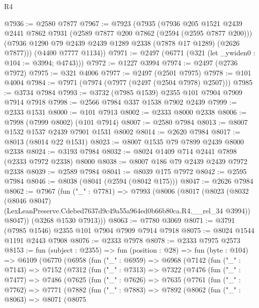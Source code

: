 \begin{lexlean}{R4}
\begin{coremodule}
@7936 := @2580 @7877
@7967 := @7923
    (@7935
      (@7936
        @205
        @1521
        @2439
        @2441
        @7862
        @7931
        (@2589 @7877 @200 @7862 (@2594 (@2595 @7877 @200)))
        (@7936 @1290 @79 @2439 @2439 @1289 @2338 (@7878 @17 @1289) (@2626 @7877)))
      (@4400 @7777 @1134))
@7971 := @2497 (@6771 (@321 (let _ywiden0 : @104 := @3994; @4743)))
@7972 := @1227 @3994
@7974 := @2497 (@2736 @7972)
@7975 := @321 @4006
@7977 := @2497 (@2501 @7975)
@7978 := @101 @4004
@7984 := @7971 (@7974 (@7977 (@2497 (@2504 @7978) @2507)))
@7985 := @3734 @7984
@7993 := @3732 (@7985 @1539) @2355 @101 @7904 @7909 @7914 @7918
@7998 := @2566 @7984 @337 @1538 @7902 @2439
@7999 := @2333 @1531
@8000 := @101 @7913
@8002 := @2333 @8000 @2338
@8006 := @7998 (@7999 @8002) (@101 @7914)
@8007 := @2580 @7984
@8013 := @8007 @1532 @1537 @2439 @7901 @1531 @8002
@8014 := @2620 @7984
@8017 := @8013 (@8014 @22 @1531)
@8023 := @8007 @1535 @79 @7899 @2439 @8000 @2338
@8024 := @3193 @7984
@8032 := @8024 @1409 @714 @2441 @7898 (@2333 @7972 @2338) @8000
@8038 := @8007 @186 @79 @2439 @2439 @7972 @2338
@8039 := @2589 @7984
@8041 := @8039 @175 @7972
@8042 := @2595 @7984
@8046 := @8038 (@8041 (@2594 (@8042 @175)))
@8047 := @2626 @7984
@8062 := @7967
    (fun ("_" : @7781) =>
    @7993
      (@8006
        (@8017
          (@8023
            (@8032
              (@8046 @8047)
              (LexLeanPreserve.Cdebed7637d9c49a55a964ed0b66b80ca.R4.__rel_34 @3994))
            @8047))
        (@3268 @1530 @7913)))
@8063 := @7780 @3069
@8071 := @3791 (@7985 @1546) @2355 @101 @7904 @7909 @7914 @7918
@8075 := @8024 @1544 @1191 @2443 @7908
@8076 := @2333 @7978
@8078 := @2333 @7975 @2573
@8153 := fun (subject : @2355) =>
  fun (position : @28) =>
  fun (byte : @104) =>
  @6109
    (@6770
      (@6958
        (fun ("_" : @6959) =>
        @6968
          (@7142
            (fun ("_" : @7143) =>
            @7152
              (@7312
                (fun ("_" : @7313) =>
                @7322
                  (@7476
                    (fun ("_" : @7477) =>
                    @7486
                      (@7625
                        (fun ("_" : @7626) =>
                        @7635
                          (@7761
                            (fun ("_" : @7762) =>
                            @7771
                              (@7882
                                (fun ("_" : @7883) =>
                                @7892
                                  (@8062
                                    (fun ("_" : @8063) =>
                                    @8071
                                      (@8075

\end{coremodule}
\end{lexlean}
